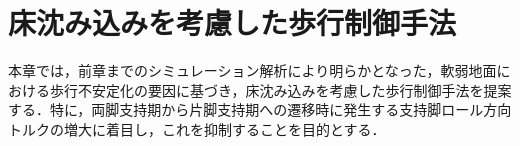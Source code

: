 \chapter{床沈み込みを考慮した歩行制御手法}
\label{chap:method}

本章では，前章までのシミュレーション解析により明らかとなった，軟弱地面における歩行不安定化の要因に基づき，床沈み込みを考慮した歩行制御手法を提案する．特に，両脚支持期から片脚支持期への遷移時に発生する支持脚ロール方向トルクの増大に着目し，これを抑制することを目的とする．


